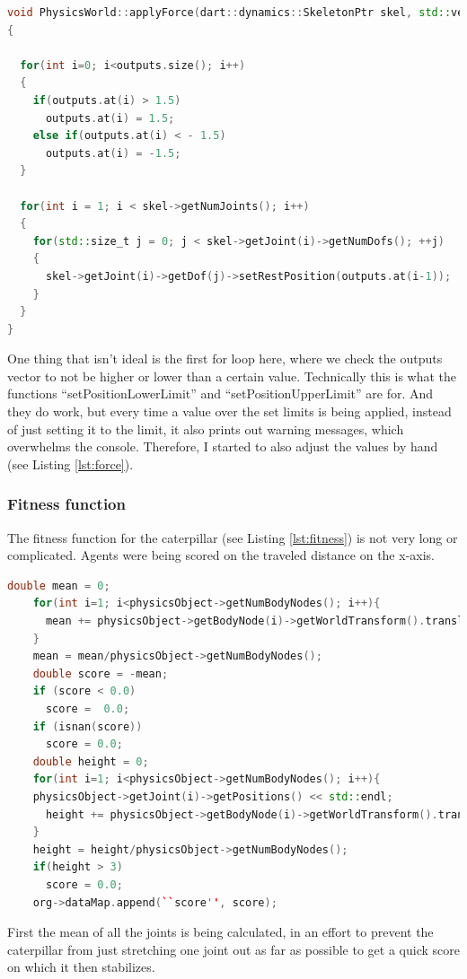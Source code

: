 \documentclass[12pt,oneside,listof=totoc,paper=a4,headings=small]{scrbook}
\begin{document}
\begin{lstlisting}[language=C++, label={lst:force}, caption=Force application]
void PhysicsWorld::applyForce(dart::dynamics::SkeletonPtr skel, std::vector<double> outputs)
{
  
  for(int i=0; i<outputs.size(); i++)
  {
    if(outputs.at(i) > 1.5)
      outputs.at(i) = 1.5;
    else if(outputs.at(i) < - 1.5)
      outputs.at(i) = -1.5;
  }
  
  for(int i = 1; i < skel->getNumJoints(); i++)
  {
    for(std::size_t j = 0; j < skel->getJoint(i)->getNumDofs(); ++j)
    {
      skel->getJoint(i)->getDof(j)->setRestPosition(outputs.at(i-1));
    }
  }
}
\end{lstlisting}
One thing that isn't ideal is the first for loop here, where we check the outputs vector to not be higher or lower than a certain value. Technically this is what the functions ``setPositionLowerLimit'' and ``setPositionUpperLimit'' are for. And they do work, but every time a value over the set limits is being applied, instead of just setting it to the limit, it also prints out warning messages, which overwhelms the console. Therefore, I started to also adjust the values by hand (see Listing \ref{lst:force}).

\newpage

\subsubsection{Fitness function}
The fitness function for the caterpillar (see Listing \ref{lst:fitness}) is not very long or complicated. Agents were being scored on the traveled distance on the x-axis.

\begin{lstlisting}[language=C++, label={lst:fitness}, caption=Fitness Function]
double mean = 0;
    for(int i=1; i<physicsObject->getNumBodyNodes(); i++){
      mean += physicsObject->getBodyNode(i)->getWorldTransform().translation()[0];
    }
    mean = mean/physicsObject->getNumBodyNodes();
    double score = -mean;
    if (score < 0.0)
      score =  0.0;
    if (isnan(score))
      score = 0.0;
    double height = 0;
    for(int i=1; i<physicsObject->getNumBodyNodes(); i++){
    physicsObject->getJoint(i)->getPositions() << std::endl;
      height += physicsObject->getBodyNode(i)->getWorldTransform().translation()[2];
    }
    height = height/physicsObject->getNumBodyNodes();
    if(height > 3)
      score = 0.0;
    org->dataMap.append(``score'', score);
\end{lstlisting}
First the mean of all the joints is being calculated, in an effort to prevent the caterpillar from just stretching one joint out as far as possible to get a quick score on which it then stabilizes. 
\end{document}
